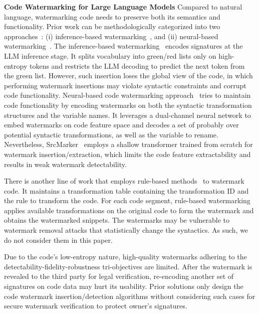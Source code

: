 


\textbf{Code Watermarking for Large Language Models}
Compared to natural language, watermarking code needs to preserve both its semantics and functionality. Prior work can be methodologically categorized into two approaches~\cite{zhang2024remark}:  (i) inference-based watermarking~\cite{lee2023wrote,ning2024mcgmark}, and (ii) neural-based watermarking~\cite{yang2024srcmarker}. 
The inference-based watermarking~\cite{lee2023wrote} encodes signatures at the LLM inference stage. It splits vocabulary into green/red lists only on high-entropy tokens and restricts the LLM decoding to predict the next token from the green list. However, 
such insertion loses the global view of the code, in which performing watermark insertions may violate syntactic constraints and corrupt code functionality.    
Neural-based code watermarking approach~\cite{yang2024srcmarker} tries to maintain code functionality by encoding watermarks on both the syntactic transformation structures and the variable names. It leverages a dual-channel neural network to embed watermarks on code feature space and decodes a set of probably over potential syntactic transformations, as well as the variable to rename. Nevertheless, SrcMarker~\cite{yang2024srcmarker} employs a shallow transformer trained from scratch for watermark insertion/extraction, which limits the code feature extractability and results in weak watermark detectability. 

There is another line of work that employs rule-based methods~\cite{li2023protecting,li2024resilient} to watermark code. It maintains a transformation table containing the transformation ID and the rule to transform the code. For each code segment, rule-based watermarking applies available transformations on the original code to form the watermark and obtains the watermarked snippets. The watermarks may be vulnerable to watermark removal attacks that statistically change the syntactics. As such, we do not consider them in this paper. 


Due to the code's low-entropy nature, high-quality watermarks adhering to the detectability-fidelity-robustness tri-objectives are limited. After the watermark is revealed to the third party for legal verification, re-encoding another set of signatures on code data may hurt its usability. Prior solutions only design the code watermark insertion/detection algorithms without considering such cases for secure watermark verification to protect owner's signatures.

